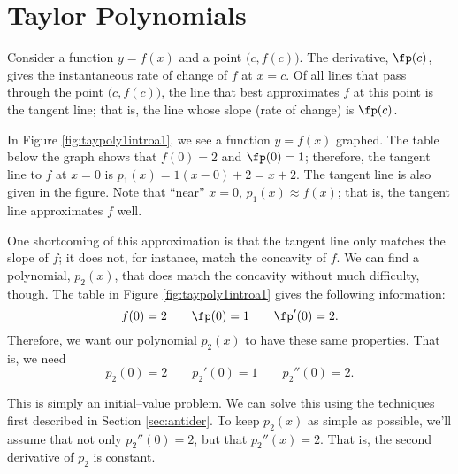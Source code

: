 \section{Taylor Polynomials}\label{sec:taylor_poly1}

Consider a function $y=f(x)$ and a point $\big(c,f(c)\big)$. The derivative, $\fp(c)$, gives the instantaneous rate of change of $f$ at $x=c$. Of all lines that pass through the point $\big(c,f(c)\big)$, the line that best approximates $f$ at this point is the tangent line; that is, the line whose slope (rate of change) is $\fp(c)$.

In Figure \ref{fig:taypoly1introa1}, we see a function $y=f(x)$ graphed. The table below the graph shows that $f(0)=2$ and $\fp(0) = 1$; therefore, the tangent line to $f$ at $x=0$ is $p_1(x) = 1(x-0)+2 = x+2$. The tangent line is also given in the figure. Note that ``near'' $x=0$, $p_1(x) \approx f(x)$; that is, the tangent line approximates $f$ well.


One shortcoming of this approximation is that the tangent line only matches the slope of $f$; it does not, for instance, match the concavity of $f$. We can find a polynomial, $p_2(x)$, that does match the concavity without much difficulty, though. The table in Figure \ref{fig:taypoly1introa1} gives the following information:
$$f(0) = 2 \qquad \fp(0) = 1\qquad \fp'(0) = 2.$$
Therefore, we want our polynomial $p_2(x)$ to have these same properties. That is, we need $$p_2(0) = 2 \qquad p_2'(0) = 1 \qquad p_2''(0) = 2.$$

This is simply an initial--value problem. We can solve this using the techniques first described in Section \ref{sec:antider}. To keep $p_2(x)$ as simple as possible, we'll assume that not only  $p_2''(0)=2$, but that $p_2''(x)=2$. That is, the second derivative of $p_2$ is  constant.

